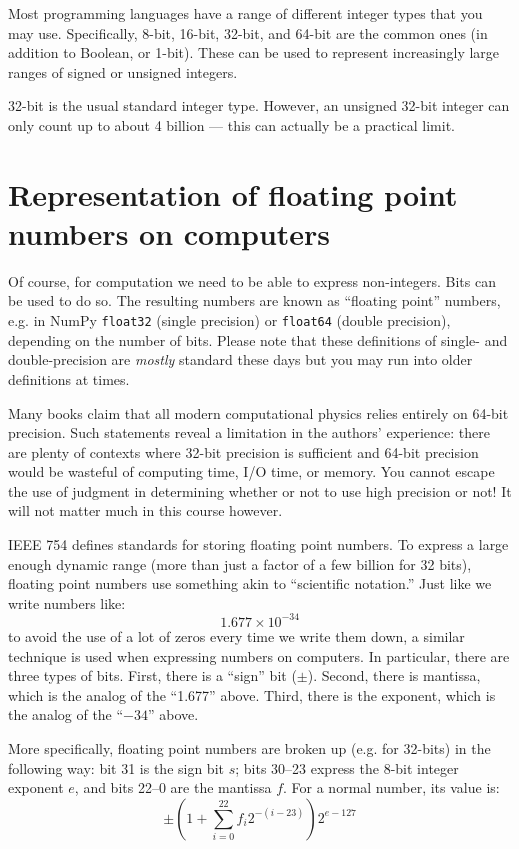 Most programming languages have a range of different integer types
that you may use. Specifically, 8-bit, 16-bit, 32-bit, and 64-bit are
the common ones (in addition to Boolean, or 1-bit).  These can be used
to represent increasingly large ranges of signed or unsigned integers.

32-bit is the usual standard integer type. However, an unsigned 32-bit
integer can only count up to about 4 billion --- this can actually be
a practical limit. 

\section{Representation of floating point numbers on computers}

Of course, for computation we need to be able to express
non-integers. Bits can be used to do so. The resulting numbers are
known as ``floating point'' numbers, e.g. in NumPy {\tt float32}
(single precision) or {\tt float64} (double precision), depending on
the number of bits. Please note that these definitions of single- and
double-precision are {\it mostly} standard these days but you may run
into older definitions at times.

Many books claim that all modern computational physics relies entirely
on 64-bit precision. Such statements reveal a limitation in the
authors' experience: there are plenty of contexts where 32-bit
precision is sufficient and 64-bit precision would be wasteful of
computing time, I/O time, or memory. You cannot escape the use of
judgment in determining whether or not to use high precision or not!
It will not matter much in this course however.

IEEE 754 defines standards for storing floating point numbers.  To
express a large enough dynamic range (more than just a factor of a few
billion for 32 bits), floating point numbers use something akin to
``scientific notation.'' Just like we write numbers like:
\begin{equation}
1.677 \times 10^{-34}
\end{equation}
to avoid the use of a lot of zeros every time we write them down, a
similar technique is used when expressing numbers on computers. In
particular, there are three types of bits. First, there is a ``sign''
bit ($\pm$). Second, there is mantissa, which is the analog of the
``1.677'' above. Third, there is the exponent, which is the analog of
the ``$-34$'' above.

More specifically, floating point numbers are broken up (e.g. for
32-bits) in the following way: bit 31 is the sign bit $s$; bits 30--23
express the 8-bit integer exponent $e$, and bits 22--0 are the
mantissa $f$. For a normal number, its value is:
\begin{equation}
\pm \left(1 + \sum_{i=0}^{22} f_i 2^{-(i-23)} \right) 2^{e-127}
\end{equation}

